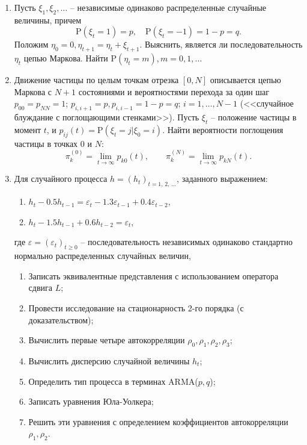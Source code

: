 \documentclass[a4paper,14pt]{extreport}
\renewcommand{\=}[1]{\stackrel{#1}{=}} %
\newcommand{\Proba}{\mathrm{P}}
\newcommand{\generaltime}{t \geqslant 0}
\newcommand{\discretetime}{t = 1,\,2,\,\ldots}
\newcommand{\newprocess}[1]{
	\ensuremath{
		#1 = \left(#1 _t\right)_{\generaltime}
	}
}
\newcommand{\newprocessd}[1]{
	\ensuremath{
		#1 = \left(#1 _t\right)_{\discretetime}
	}
}
\begin{document}
\begin{enumerate}

	\item Пусть $\xi_1, \xi_2, \ldots$ -- независимые одинаково
	распределенные случайные величины, причем
	\[
	\Proba (\xi_t = 1) = p, \quad \Proba (\xi_t = -1) = 1 - p = q.
	\]
	Положим $\eta_0 = 0, \eta_{t+1} = \eta_t + \xi_{t + 1}$. 
	Выяснить, является ли последовательность $\eta_t$ цепью Маркова. 
	Найти $\Proba(\eta_t = m), m = 0, 1, \ldots$

	\item Движение частицы по целым точкам отрезка $[0, N]$
	описывается цепью Маркова с $N+1$ состояниями и вероятностями
	перехода за один шаг $p_{00} = p_{NN} = 1$; $p_{i, i+1} = p, p_{i, i-1} = 1 - p = q$;
	$i = 1, \ldots, N - 1$ (<<случайное блуждание с поглощающими
	стенками>>). Пусть  $\xi_t$ -- положение частицы 
	в момент $t$, и $p_{ij}(t) = \Proba (\xi_t = j | \xi_0 = i)$.
	Найти вероятности поглощения частицы в точках $0$ и $N$:
	\[
	\pi_k^{(0)} = \lim\limits_{t \to \infty} p_{k0}(t),
	\qquad
	\pi_k^{(N)} = \lim\limits_{t \to \infty} p_{kN}(t).
	\]


	\item Для случайного процесса $\newprocessd{h}$, заданного выражением:
	\begin{enumerate}
		\item $h_t - 0.5 h_{t-1} = \varepsilon_t - 1.3 \varepsilon_{t-1} + 0.4 \varepsilon_{t-2}$,
		\item $h_t - 1.5 h_{t-1} + 0.6 h_{t-2} = \varepsilon_t$,
	\end{enumerate}
	где $\newprocess{\varepsilon}$ -- последовательность независимых
	одинаково стандартно нормально распределенных случайных величин,
	\begin{enumerate}
	\item Записать эквивалентные представления с использованием оператора сдвига $L$;
	\item Провести исследование на стационарность 2-го порядка (с доказательством);
	\item Вычислить первые четыре автокорреляции $\rho_0, \rho_1, \rho_2, \rho_3$;
	\item Вычислить дисперсию случайной величины $h_t$;
	\item Определить тип процесса в терминах ARMA($p, q$);
	\item Записать уравнения Юла-Уолкера;
	\item Решить эти уравнения с определением коэффициентов автокорреляции $\rho_1, \rho_2$.
	\end{enumerate}


\end{enumerate}
\end{document}
